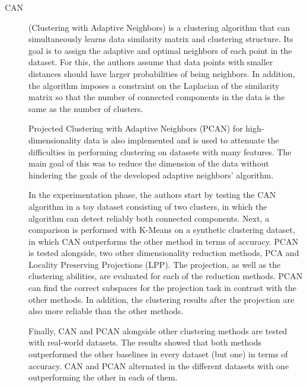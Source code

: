 \begin{description}
    \item[CAN]\cite{Nie.Wang.ea_Clusteringprojectedclustering_2014a} (Clustering with Adaptive Neighbors) is a clustering algorithm that can simultaneously learns data similarity matrix and clustering structure. Its goal is to assign the adaptive and optimal neighbors of each point in the dataset. For this, the authors assume that data points with smaller distances should have larger probabilities of being neighbors. In addition, the algorithm imposes a constraint on the Laplacian of the similarity matrix so that the number of connected components in the data is the same as the number of clusters.
    
    Projected Clustering with Adaptive Neighbors (PCAN) for high-dimensionality data is also implemented and is used to attenuate the difficulties in performing clustering on datasets with many features. The main goal of this was to reduce the dimension of the data without hindering the goals of the developed adaptive neighbors' algorithm.

    In the experimentation phase, the authors start by testing the CAN algorithm in a toy dataset consisting of two clusters, in which the algorithm can detect reliably both connected components. Next, a comparison is performed with K-Means on a synthetic clustering dataset, in which CAN outperforms the other method in terms of accuracy. PCAN is tested alongside, two other dimensionality reduction methods, PCA and Locality Preserving Projections (LPP). The projection, as well as the clustering abilities, are evaluated for each of the reduction methods. PCAN can find the correct subspaces for the projection task in contrast with the other methods. In addition, the clustering results after the projection are also more reliable than the other methods. 

    Finally, CAN and PCAN alongside other clustering methods are tested with real-world datasets. The results showed that both methods outperformed the other baselines in every dataset (but one) in terms of accuracy. CAN and PCAN alternated in the different datasets with one outperforming the other in each of them.
\end{description}

